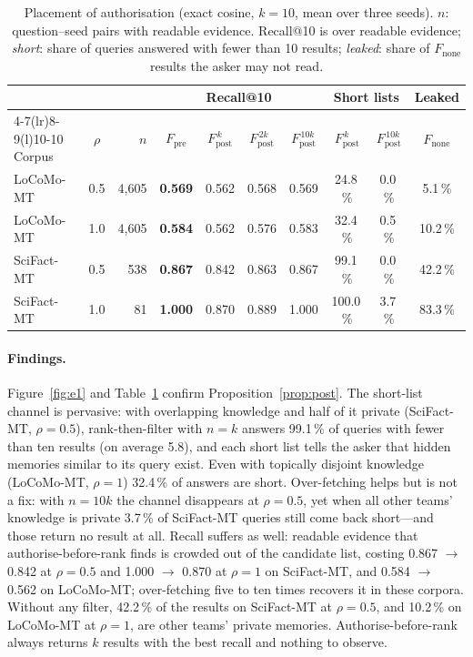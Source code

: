 \documentclass[11pt,a4paper]{article}
\theoremstyle{remark}
\newcommand{\best}[1]{\textbf{#1}}
\begin{document}
\begin{table}[htbp]
\centering
\footnotesize
\caption{Placement of authorisation (exact cosine, $k=10$, mean over three seeds). $n$: question--seed pairs with readable
evidence. Recall@10 is over readable evidence; \emph{short}: share of queries answered with fewer than 10 results;
\emph{leaked}: share of $F_{\mathrm{none}}$ results the asker may not read.}
\label{tab:e1}
\setlength{\tabcolsep}{4.5pt}
\begin{tabular}{@{}lcrccccccc@{}}
\toprule
 & & & \multicolumn{4}{c}{Recall@10} & \multicolumn{2}{c}{Short lists} & Leaked \\
\cmidrule(lr){4-7}\cmidrule(lr){8-9}\cmidrule(l){10-10}
Corpus & $\rho$ & $n$ & $F_{\mathrm{pre}}$ & $F_{\mathrm{post}}^{\,k}$ & $F_{\mathrm{post}}^{\,2k}$ & $F_{\mathrm{post}}^{\,10k}$ & $F_{\mathrm{post}}^{\,k}$ & $F_{\mathrm{post}}^{\,10k}$ & $F_{\mathrm{none}}$ \\
\midrule
LoCoMo-MT & 0.5 & 4{,}605 & \best{0.569} & 0.562 & 0.568 & 0.569 & 24.8\,\% & 0.0\,\% & 5.1\,\% \\
LoCoMo-MT & 1.0 & 4{,}605 & \best{0.584} & 0.562 & 0.576 & 0.583 & 32.4\,\% & 0.5\,\% & 10.2\,\% \\
SciFact-MT & 0.5 & 538 & \best{0.867} & 0.842 & 0.863 & 0.867 & 99.1\,\% & 0.0\,\% & 42.2\,\% \\
SciFact-MT & 1.0 & 81 & \best{1.000} & 0.870 & 0.889 & 1.000 & 100.0\,\% & 3.7\,\% & 83.3\,\% \\
\bottomrule
\end{tabular}
\end{table}

\paragraph{Findings.} Figure~\ref{fig:e1} and Table~\ref{tab:e1} confirm Proposition~\ref{prop:post}. The short-list
channel is pervasive: with overlapping knowledge and half of it private (SciFact-MT, $\rho=0.5$), rank-then-filter with
$n=k$ answers 99.1\,\% of queries with fewer than ten results (on average
5.8), and each short list tells the asker that hidden memories similar to its query exist.
Even with topically disjoint knowledge (LoCoMo-MT, $\rho=1$) 32.4\,\% of answers are short.
Over-fetching helps but is not a fix: with $n=10k$ the channel disappears at $\rho=0.5$, yet when all other teams'
knowledge is private 3.7\,\% of SciFact-MT queries still come back short---and those return
no result at all. Recall suffers as well: readable evidence that authorise-before-rank finds is crowded out of the candidate
list, costing 0.867 $\rightarrow$ 0.842 at $\rho=0.5$ and
1.000 $\rightarrow$ 0.870 at $\rho=1$ on SciFact-MT, and
0.584 $\rightarrow$ 0.562 on LoCoMo-MT; over-fetching five to ten times
recovers it in these corpora. Without any filter, 42.2\,\% of the results on SciFact-MT at
$\rho=0.5$, and 10.2\,\% on LoCoMo-MT at $\rho=1$, are other teams' private memories.
Authorise-before-rank always returns $k$ results with the best recall and nothing to observe.
\end{document}
